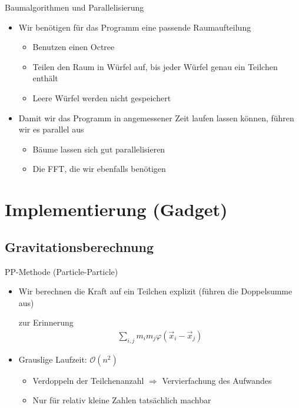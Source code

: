 \documentclass{beamer}
\begin{document}
\begin{frame}{Baumalgorithmen und Parallelisierung}
  \begin{itemize}
    \item<1-> Wir benötigen für das Programm eine passende Raumaufteilung
      \begin{itemize}
        \item<2-> Benutzen einen \alert{Octree} \pause
        \item<3-> Teilen den Raum in Würfel auf, bis jeder Würfel genau ein Teilchen
          enthält \pause
        \item<4-> Leere Würfel werden nicht gespeichert \pause
      \end{itemize}
      \vskip20pt
    \item<5-> Damit wir das Programm in angemessener Zeit laufen lassen können,
      führen wir es parallel aus
      \begin{itemize}
        \item Bäume lassen sich gut parallelisieren
        \item<6-> Die FFT, die wir ebenfalls benötigen
      \end{itemize}
  \end{itemize}
\end{frame}

\section{Implementierung (Gadget)}
\subsection{Gravitationsberechnung}
\begin{frame}{PP-Methode (Particle-Particle)}
  \begin{itemize}
    \item Wir berechnen die Kraft auf ein Teilchen explizit (führen die
      Doppelsumme aus) \pause \\
      \begin{block}{zur Erinnerung}
        \begin{align}\sum_{i,j} m_i m_j \varphi(\vec x_i - \vec x_j)\end{align}
      \end{block}
    \item Grauslige Laufzeit: $\mathcal{O}(n^2)$
      \begin{itemize}
        \item Verdoppeln der Teilchenanzahl $\Rightarrow$ Vervierfachung des
          Aufwandes \pause
        \item Nur für relativ kleine Zahlen tatsächlich machbar
      \end{itemize}
  \end{itemize}
\end{frame}
\end{document}
